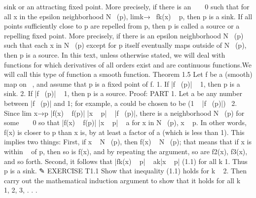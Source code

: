 \documentclass{article}
\begin{document}
sink or an attracting fixed point. More precisely, if there is an     0 such that
for all x in the epsilon neighborhood N  (p), limk→  fk(x)   p, then p is a sink. If
all points sufficiently close to p are repelled from p, then p is called a source or a
repelling fixed point. More precisely, if there is an epsilon neighborhood N  (p)
such that each x in N  (p) except for p itself eventually maps outside of N  (p),
then p is a source.
In this text, unless otherwise stated, we will deal with functions for which
derivatives of all orders exist and are continuous functions.We will call this type
of function a smooth function.
Theorem 1.5 Let f be a (smooth) map on  , and assume that p is a fixed
point of f.
1. If |f  (p)|   1, then p is a sink.
2. If |f  (p)|   1, then p is a source.
Proof: PART 1. Let a be any number between |f  (p)| and 1; for example, a
could be chosen to be (1   |f  (p)|)  2. Since
lim
x→p
|f(x)   f(p)|
|x   p|   |f  (p)|,
there is a neighborhood N  (p) for some     0 so that
|f(x)   f(p)|
|x   p|   a
for x in N  (p), x   p.
In other words, f(x) is closer to p than x is, by at least a factor of a (which is
less than 1). This implies two things: First, if x   N  (p), then f(x)   N  (p); that
means that if x is within   of p, then so is f(x), and by repeating the argument, so
are f2(x), f3(x), and so forth. Second, it follows that
|fk(x)   p|   ak|x   p| (1.1)
for all k 
 1. Thus p is a sink.
✎ EXERCISE T1.1
Show that inequality (1.1) holds for k   2. Then carry out the mathematical
induction argument to show that it holds for all k   1, 2, 3, . . .
\end{document}
